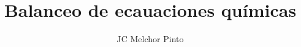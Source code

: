 \documentclass[12pt,addpoints,answers]{guia}
\title{Balanceo de ecauaciones químicas}
\author{JC Melchor Pinto}
\begin{document}
\INFO%
\begin{multicols}{2}
    
    
\end{multicols}
\ejemplosboxed[]
\begin{questions}
    \questionboxed[10]{}
    \ejemplosboxed[]
    \ejemplosboxed[]
    \ejemplosboxed[]
    \questionboxed[10]{}
    \questionboxed[10]{}
    \questionboxed[10]{}
    \ejemplosboxed[]
    \questionboxed[10]{}
    \questionboxed[10]{}
    \ejemplosboxed[]
    \questionboxed[10]{}
    \ejemplosboxed[]
    \questionboxed[10]{}
    \ejemplosboxed[]
    \questionboxed[10]{}
    \questionboxed[10]{}
\end{questions}
\end{document}
